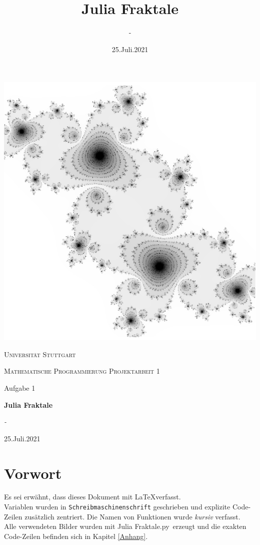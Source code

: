 \documentclass[12pt]{scrartcl}
\title{Julia Fraktale}
\date{25.Juli.2021}
\author{-}
\begin{document}
\begin{titlepage}
\centering
\includegraphics[scale=0.3]{Titel.jpg}\par
\vspace{1.5cm}
{\scshape\LARGE Universität Stuttgart \par}
\vspace{1.5cm}
{\scshape\Large Mathematische Programmierung Projektarbeit 1\par}
\vspace{1.5cm}
{\small Aufgabe 1\par}
{\huge\bfseries Julia Fraktale\par}
\vspace{1.5cm}
{\Large\itshape -\par}
\vfill
{\large 25.Juli.2021\par}
\end{titlepage}


\tableofcontents
\newpage

\section{Vorwort}
Es sei erwähnt, dass dieses Dokument mit \LaTeX verfasst.\\
Variablen wurden in \texttt{Schreibmaschinenschrift} geschrieben und explizite Code-Zeilen zusätzlich zentriert. Die Namen von Funktionen wurde \textit{kursiv} verfasst.\\
Alle verwendeten Bilder wurden mit \glqq Julia Fraktale.py\grqq ~erzeugt und die exakten Code-Zeilen befinden sich in Kapitel \ref{Anhang}.
\end{document}

